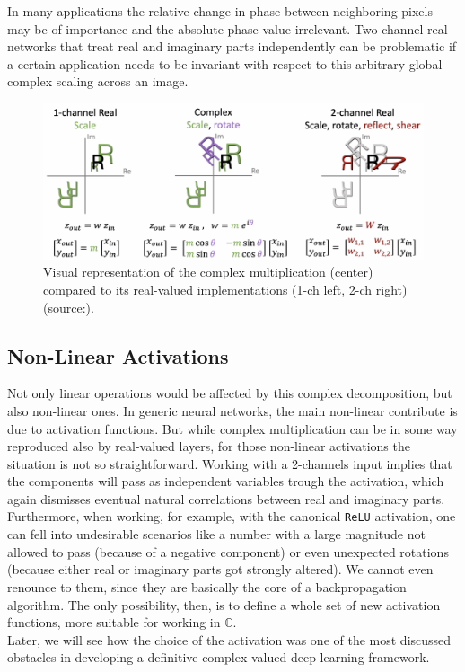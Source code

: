 \documentclass[../main.tex]{subfiles}
\begin{document}
In many applications the relative change in phase between neighboring pixels may be of importance and the absolute phase value irrelevant. Two-channel real networks that treat real and imaginary parts independently can be problematic if a certain application needs to be invariant with respect to this arbitrary global complex scaling across an image. 

\begin{figure}[!ht]
	\centering
	\includegraphics[width=\textwidth]{pictures/multiplication_dof.pdf}
	\caption{Visual representation of the complex multiplication (center) compared to its real-valued implementations (1-ch left, 2-ch right) (source:\cite{Virtue:EECS-2019-126}).}
	\label{fig:mult_dof}
\end{figure}


\subsection*{Non-Linear Activations}
Not only linear operations would be affected by this complex decomposition, but also non-linear ones. In generic neural networks, the main non-linear contribute is due to activation functions. But while complex multiplication can be in some way reproduced also by real-valued layers, for those non-linear activations the situation is not so straightforward. Working with a 2-channels input implies that the components will pass as independent variables trough the activation, which again dismisses eventual natural correlations between real and imaginary parts. Furthermore, when working, for example, with the canonical \texttt{ReLU} activation, one can fell into undesirable scenarios like a number with a large magnitude not allowed to pass (because of a negative component) or even unexpected rotations (because either real or imaginary parts got strongly altered). We cannot even renounce to them, since they are basically the core of a backpropagation algorithm. The only possibility, then, is to define a whole set of new activation functions, more suitable for working in $\mathds{C}$.\\
Later, we will see how the choice of the activation was one of the most discussed obstacles in developing a definitive complex-valued deep learning framework.
\end{document}
